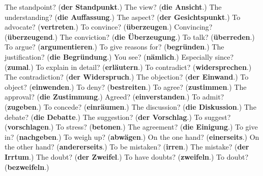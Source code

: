 \begin{tcolorbox}[breakable,colback=teal!4,colframe=teal!35!black,title={Before you move on}]
The standpoint? (\textbf{der Standpunkt}.) The view? (\textbf{die Ansicht}.) The understanding? (\textbf{die Auffassung}.) The aspect? (\textbf{der Gesichtspunkt}.) To advocate? (\textbf{vertreten}.) To convince? (\textbf{überzeugen}.) Convincing? (\textbf{überzeugend}.) The conviction? (\textbf{die Überzeugung}.) To talk? (\textbf{überreden}.) To argue? (\textbf{argumentieren}.) To give reasons for? (\textbf{begründen}.) The justification? (\textbf{die Begründung}.) You see? (\textbf{nämlich}.) Especially since? (\textbf{zumal}.) To explain in detail? (\textbf{erläutern}.) To contradict? (\textbf{widersprechen}.) The contradiction? (\textbf{der Widerspruch}.) The objection? (\textbf{der Einwand}.) To object? (\textbf{einwenden}.) To deny? (\textbf{bestreiten}.) To agree? (\textbf{zustimmen}.) The approval? (\textbf{die Zustimmung}.) Agreed? (\textbf{einverstanden}.) To admit? (\textbf{zugeben}.) To concede? (\textbf{einräumen}.) The discussion? (\textbf{die Diskussion}.) The debate? (\textbf{die Debatte}.) The suggestion? (\textbf{der Vorschlag}.) To suggest? (\textbf{vorschlagen}.) To stress? (\textbf{betonen}.) The agreement? (\textbf{die Einigung}.) To give in? (\textbf{nachgeben}.) To weigh up? (\textbf{abwägen}.) On the one hand? (\textbf{einerseits}.) On the other hand? (\textbf{andererseits}.) To be mistaken? (\textbf{irren}.) The mistake? (\textbf{der Irrtum}.) The doubt? (\textbf{der Zweifel}.) To have doubts? (\textbf{zweifeln}.) To doubt? (\textbf{bezweifeln}.)
\end{tcolorbox}
